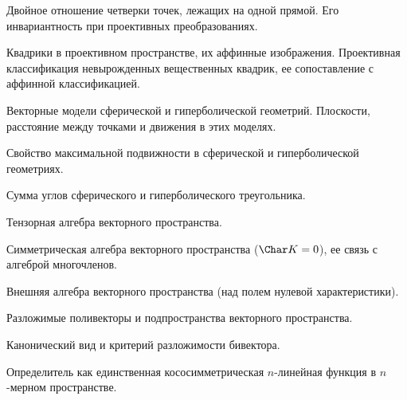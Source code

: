 \documentclass[a4paper]{article}
\begin{document}
\begin{nums}{-1}
\item Двойное отношение четверки точек, лежащих на одной прямой. Его инвариантность при проективных преобразованиях.
\item Квадрики в проективном пространстве, их аффинные изображения. Проективная классификация
невырожденных вещественных квадрик, ее сопоставление с аффинной классификацией.
\item Векторные модели сферической и гиперболической геометрий. Плоскости, расстояние между точками и движения в этих моделях.
\item Свойство максимальной подвижности в сферической и гиперболической геометриях.
\item Сумма углов сферического и гиперболического треугольника.
\item Тензорная алгебра векторного пространства.
\item Симметрическая алгебра векторного пространства ($\Char K = 0$), ее связь с алгеброй многочленов.
\item Внешняя алгебра векторного пространства (над полем нулевой характеристики).
\item Разложимые поливекторы и подпространства векторного пространства.
\item Канонический вид и критерий разложимости бивектора.
\item Определитель как единственная кососимметрическая $n$-линейная функция в $n$-мерном пространстве.
\end{nums}

\medskip\dmvntrail
\end{document}
